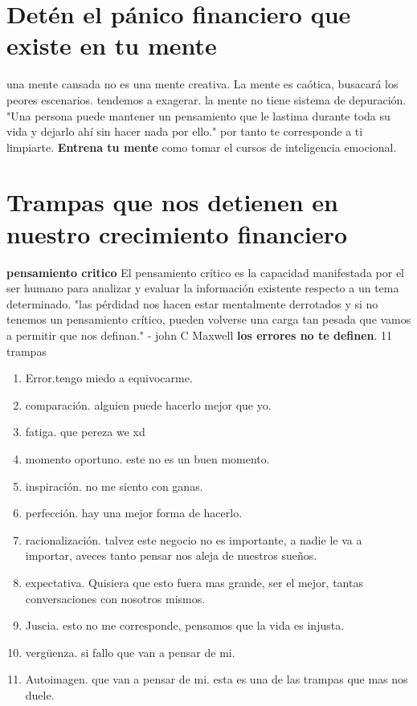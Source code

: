 \documentclass{article}
\begin{document}
\section{Detén el pánico financiero que existe en tu mente}
una mente cansada no es una mente creativa.
La mente es caótica, busacará los peores escenarios.
tendemos a exagerar.
la mente no tiene sistema de depuración.
"Una persona puede
mantener un
pensamiento que le
lastima durante toda
su vida y dejarlo ahí
sin hacer nada por ello."
por tanto te corresponde a ti limpiarte. \textbf{Entrena tu mente}
como tomar el cursos de inteligencia emocional.

\section{Trampas que nos detienen en nuestro crecimiento financiero}

\textbf{pensamiento critico}
El pensamiento crítico es la capacidad
manifestada por el ser humano para
analizar y evaluar la información existente
respecto a un tema determinado.
"las pérdidad nos hacen estar mentalmente derrotados y si no tenemos un pensamiento crítico,
pueden volverse una carga tan pesada que vamos a permitir que nos definan." - john C Maxwell
\textbf{los errores no te definen}.
11 trampas \begin{enumerate}
    \item Error.tengo miedo a equivocarme.
    \item comparación. alguien puede hacerlo mejor que yo.
    \item fatiga. que pereza we xd 
    \item momento oportuno. este no es un buen momento.
    \item inspiración. no me siento con ganas.
    \item perfección. hay una mejor forma de hacerlo.
    \item racionalización. talvez este negocio no es importante, a nadie le va a importar, aveces tanto pensar nos aleja de nuestros sueños.
    \item expectativa. Quisiera que esto fuera mas grande, ser el mejor, tantas conversaciones con nosotros mismos.
    \item Juscia. esto no me corresponde, pensamos que la vida es injusta.
    \item vergüenza. si fallo que van a pensar de mi. 
    \item Autoimagen. que van a pensar de mi. esta es una de las trampas que mas nos duele.
\end{enumerate}
\end{document}
